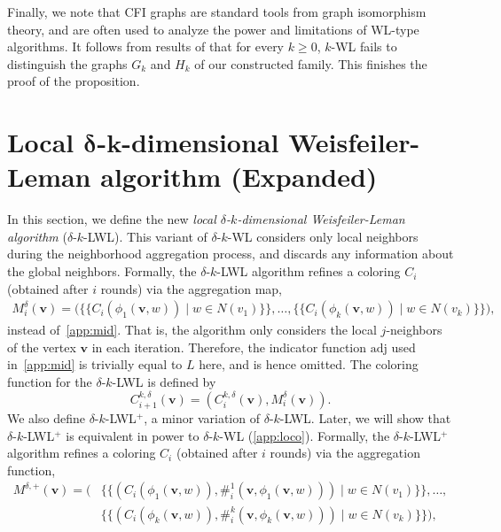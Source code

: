 \documentclass{article}
\theoremstyle{definition}
\newcommand{\new}[1]{\emph{#1}}
\renewcommand{\vec}[1]{\mathbf{#1}}
\newcommand{\kwl}{$k$-\textsf{WL}\xspace}
\newcommand{\deltakwl}{$\delta$-$k$-\textsf{WL}\xspace}
\newcommand{\localkwl}{$\delta$-$k$-\textsf{LWL}\xspace}
\newcommand{\pluskwl}{$\delta$-$k$-\textsf{LWL}$^+$\xspace}
\begin{document}
Finally, we note that CFI graphs are standard tools from graph isomorphism theory, and are often used to analyze the power and limitations of WL-type algorithms. It follows from results of \cite{Cai+1992} that for every $k \geq 0$, \kwl fails to distinguish the graphs $G_k$ and $H_k$ of our constructed family. This finishes the proof of the proposition. 

\section{Local $\boldsymbol{\delta}$-$\boldsymbol{k}$-dimensional Weisfeiler-Leman algorithm (Expanded)}\label{lwl}

In this section, we define the new \new{local $\delta$-$k$-dimensional Weisfeiler-Leman algorithm} (\localkwl). This variant of \deltakwl considers only local neighbors during the neighborhood aggregation process, and discards any information about the global neighbors. Formally, the \localkwl algorithm refines a coloring $C_i$ (obtained after $i$ rounds) via the aggregation map, 
\begin{equation}\label{app:eqnmidd}
\begin{split}
M^{\delta}_i(\vec{v}) =   \big( \{\!\! \{ C_{i}(\phi_1(\vec{v},w)) \mid w \in N(v_1) \} \!\!\}, \dots, \{\!\! \{  C_{i}(\phi_k(\vec{v},w)) \mid w \in N(v_k) \}  \!\!\} \big),
\end{split}
\end{equation}		
instead of~\cref{app:mid}. That is, the algorithm only considers the local $j$-neighbors of the vertex $\vec{v}$ in each iteration. 
Therefore, the indicator function $\mathrm{adj}$ used in~\cref{app:mid} is trivially equal to $L$ here, and is hence omitted. 
The coloring function for the \localkwl is defined by
\begin{equation*}\label{app:ck}
C^{k,\delta}_{i+1}(\vec{v}) = (C^{k,\delta}_{i}(\vec{v}), M^{\delta}_i(\vec{v})).
\end{equation*} 
We also define \pluskwl, a minor variation of \localkwl. Later, we will show that \pluskwl is equivalent in power to $\delta$-$k$-WL (\cref{app:loco}). 
Formally, the \pluskwl algorithm refines a coloring $C_i$ (obtained after $i$ rounds) via the aggregation function, 
\begin{equation}\label{middp}
\begin{split}
M^{\delta,+}(\vec{v}) =   \big( &\{\!\! \{ (C_i(\phi_1(\vec{v},w)), \#_{i}^1(\vec{v},\phi_1(\vec{v},w))) \mid w \in N(v_1) \} \!\!\}, \dots, \\ &\{\!\! \{  (C_i(\phi_k(\vec{v},w)), \#_{i}^k(\vec{v},\phi_k(\vec{v},w))) \mid w \in N(v_k) \}  \!\!\} \big),
\end{split}
\end{equation}
\end{document}
